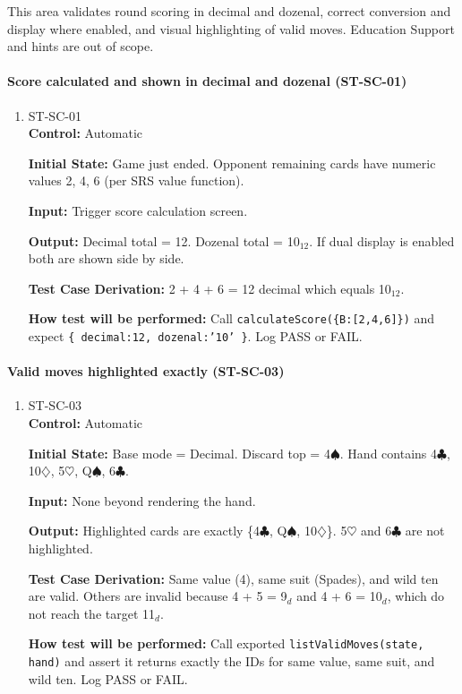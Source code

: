\documentclass[12pt, titlepage]{article}
\begin{document}
This area validates round scoring in decimal and dozenal, correct conversion and display where enabled, and visual highlighting of valid moves. Education Support and hints are out of scope.

\paragraph{Score calculated and shown in decimal and dozenal (ST-SC-01)}
\begin{enumerate}
\item{ST-SC-01\\}
\textbf{Control:} Automatic

\textbf{Initial State:} Game just ended. Opponent remaining cards have numeric values 2, 4, 6 (per SRS value function).

\textbf{Input:} Trigger score calculation screen.

\textbf{Output:} Decimal total = 12. Dozenal total = 10$_{12}$. If dual display is enabled both are shown side by side.

\textbf{Test Case Derivation:} 2 + 4 + 6 = 12 decimal which equals 10$_{12}$.

\textbf{How test will be performed:} Call \texttt{calculateScore(\{B:[2,4,6]\})} and expect \texttt{\{ decimal:12, dozenal:'10' \}}. Log PASS or FAIL.
\end{enumerate}

\paragraph{Valid moves highlighted exactly (ST-SC-03)}
\begin{enumerate}
\item{ST-SC-03\\}
\textbf{Control:} Automatic

\textbf{Initial State:} Base mode = Decimal. Discard top = 4$\spadesuit$. Hand contains 4$\clubsuit$, 10$\diamondsuit$, 5$\heartsuit$, Q$\spadesuit$, 6$\clubsuit$.

\textbf{Input:} None beyond rendering the hand.

\textbf{Output:} Highlighted cards are exactly \{4$\clubsuit$, Q$\spadesuit$, 10$\diamondsuit$\}. 5$\heartsuit$ and 6$\clubsuit$ are not highlighted.

\textbf{Test Case Derivation:} Same value (4), same suit (Spades), and wild ten are valid. Others are invalid because 4 + 5 = 9$_{d}$ and 4 + 6 = 10$_{d}$, which do not reach the target 11$_{d}$.

\textbf{How test will be performed:} Call exported \texttt{listValidMoves(state, hand)} and assert it returns exactly the IDs for same value, same suit, and wild ten. Log PASS or FAIL.
\end{enumerate}
\end{document}
